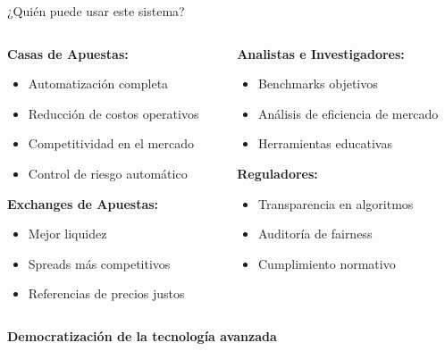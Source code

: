 \documentclass[aspectratio=169]{beamer}
\begin{document}
\begin{frame}{¿Quién puede usar este sistema?}
\begin{columns}
\begin{column}{0.5\textwidth}
\textbf{\textcolor{azulprincipai}{Casas de Apuestas:}}
\begin{itemize}
\item Automatización completa
\item Reducción de costos operativos
\item Competitividad en el mercado
\item Control de riesgo automático
\end{itemize}

\vspace{0.5cm}
\textbf{\textcolor{verdepositivo}{Exchanges de Apuestas:}}
\begin{itemize}
\item Mejor liquidez
\item Spreads más competitivos
\item Referencias de precios justos
\end{itemize}
\end{column}
\begin{column}{0.5\textwidth}
\textbf{\textcolor{rojocomplementario}{Analistas e Investigadores:}}
\begin{itemize}
\item Benchmarks objetivos
\item Análisis de eficiencia de mercado
\item Herramientas educativas
\end{itemize}

\vspace{0.5cm}
\textbf{\textcolor{azulprincipai}{Reguladores:}}
\begin{itemize}
\item Transparencia en algoritmos
\item Auditoría de fairness
\item Cumplimiento normativo
\end{itemize}
\end{column}
\end{columns}

\vspace{0.5cm}
\begin{center}
\large \textcolor{verdepositivo}{\textbf{Democratización de la tecnología avanzada}}
\end{center}
\end{frame}
\end{document}

